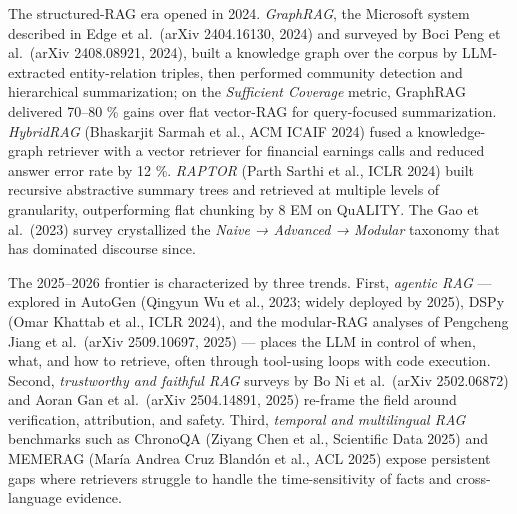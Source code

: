 The structured-RAG era opened in 2024. \emph{GraphRAG}, the Microsoft system described in Edge et al.~(arXiv 2404.16130, 2024) and surveyed by Boci Peng et al.~(arXiv 2408.08921, 2024), built a knowledge graph over the corpus by LLM-extracted entity-relation triples, then performed community detection and hierarchical summarization; on the \emph{Sufficient Coverage} metric, GraphRAG delivered 70--80 \% gains over flat vector-RAG for query-focused summarization. \emph{HybridRAG} (Bhaskarjit Sarmah et al., ACM ICAIF 2024) fused a knowledge-graph retriever with a vector retriever for financial earnings calls and reduced answer error rate by 12 \%. \emph{RAPTOR} (Parth Sarthi et al., ICLR 2024) built recursive abstractive summary trees and retrieved at multiple levels of granularity, outperforming flat chunking by 8 EM on QuALITY. The Gao et al.~(2023) survey crystallized the \emph{Naive → Advanced → Modular} taxonomy that has dominated discourse since.

The 2025--2026 frontier is characterized by three trends. First, \emph{agentic RAG} --- explored in AutoGen (Qingyun Wu et al., 2023; widely deployed by 2025), DSPy (Omar Khattab et al., ICLR 2024), and the modular-RAG analyses of Pengcheng Jiang et al.~(arXiv 2509.10697, 2025) --- places the LLM in control of when, what, and how to retrieve, often through tool-using loops with code execution. Second, \emph{trustworthy and faithful RAG} surveys by Bo Ni et al.~(arXiv 2502.06872) and Aoran Gan et al.~(arXiv 2504.14891, 2025) re-frame the field around verification, attribution, and safety. Third, \emph{temporal and multilingual RAG} benchmarks such as ChronoQA (Ziyang Chen et al., Scientific Data 2025) and MEMERAG (María Andrea Cruz Blandón et al., ACL 2025) expose persistent gaps where retrievers struggle to handle the time-sensitivity of facts and cross-language evidence.

